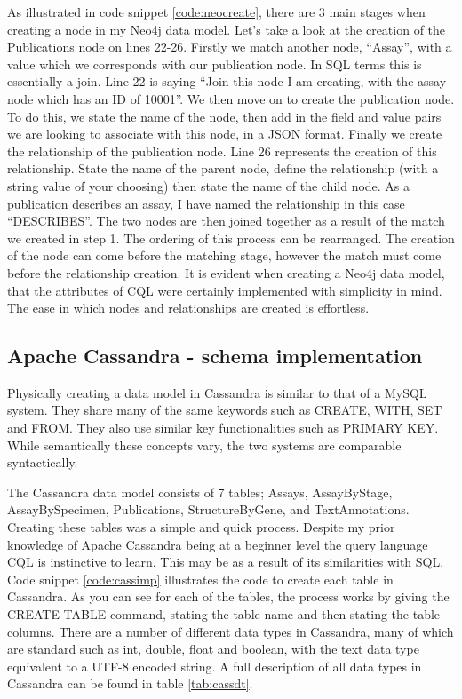 As illustrated in code snippet \ref{code:neocreate}, there are 3 main stages when creating a node in my Neo4j data model. Let's take a look at the creation of the Publications node on lines 22-26. Firstly we match another node, ``Assay'', with a value which we corresponds with our publication node. In SQL terms this is essentially a join. Line 22 is saying ``Join this node I am creating, with the assay node which has an ID of 10001''. We then move on to create the publication node. To do this, we state the name of the node, then add in the field and value pairs we are looking to associate with this node, in a JSON format. Finally we create the relationship of the publication node. Line 26 represents the creation of this relationship. State the name of the parent node, define the relationship (with a string value of your choosing) then state the name of the child node. As a publication describes an assay, I have named the relationship in this case ``DESCRIBES''. The two nodes are then joined together as a result of the match we created in step 1. The ordering of this process can be rearranged. The creation of the node can come before the matching stage, however the match must come before the relationship creation. It is evident when creating a Neo4j data model, that the attributes of CQL were certainly implemented with simplicity in mind. The ease in which nodes and relationships are created is effortless.

\subsection{Apache Cassandra - schema implementation}\label{cassandraimplementation}
Physically creating a data model in Cassandra is similar to that of a MySQL system. They share many of the same keywords such as CREATE, WITH, SET and FROM. They also use similar key functionalities such as PRIMARY KEY. While semantically these concepts vary, the two systems are comparable syntactically.

The Cassandra data model consists of 7 tables; Assays, AssayByStage, AssayBySpecimen, Publications, StructureByGene, and TextAnnotations. Creating these tables was a simple and quick process. Despite my prior knowledge of Apache Cassandra being at a beginner level the query language CQL is instinctive to learn. This may be as a result of its similarities with SQL. Code snippet \ref{code:cassimp} illustrates the code to create each table in Cassandra. As you can see for each of the tables, the process works by giving the CREATE TABLE command, stating the table name and then stating the table columns. There are a number of different data types in Cassandra, many of which are standard such as int, double, float and boolean, with the text data type equivalent to a UTF-8 encoded string. A full description of all data types in Cassandra can be found in table \ref{tab:cassdt}.

